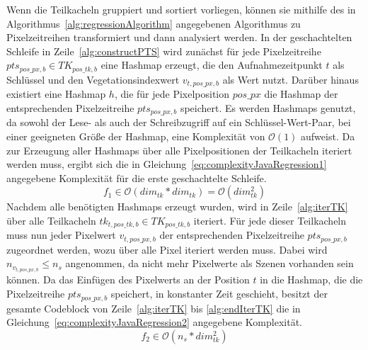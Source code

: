 Wenn die Teilkacheln gruppiert und sortiert vorliegen, können sie mithilfe des in Algorithmus~\ref{alg:regressionAlgorithm} angegebenen Algorithmus zu Pixelzeitreihen transformiert und dann analysiert werden. In der geschachtelten Schleife in Zeile~\ref{alg:constructPTS} wird zunächst für jede Pixelzeitreihe $pts_{pos\_px, b} \in TK_{pos\_tk, b}$ eine Hashmap erzeugt, die den Aufnahmezeitpunkt $t$ als Schlüssel und den Vegetationsindexwert $v_{t, pos\_px, b}$ als Wert nutzt. Darüber hinaus existiert eine Hashmap $h$, die für jede Pixelposition $pos\_px$ die Hashmap der entsprechenden Pixelzeitreihe $pts_{pos\_px, b}$ speichert. Es werden Hashmaps genutzt, da sowohl der Lese- als auch der Schreibzugriff auf ein Schlüssel-Wert-Paar, bei einer geeigneten Größe der Hashmap, eine Komplexität von $\mathcal{O}(1)$ aufweist. Da zur Erzeugung aller Hashmaps über alle Pixelpositionen der Teilkacheln iteriert werden muss, ergibt sich die in Gleichung~\ref{eq:complexityJavaRegression1} angegebene Komplexität für die erste geschachtelte Schleife. 
%
\begin{equation} \label{eq:complexityJavaRegression1}
f_1 \in \mathcal{O}(dim_{tk} * dim_{tk}) = \mathcal{O}(dim_{tk}^2)
\end{equation}
%
Nachdem alle benötigten Hashmaps erzeugt wurden, wird in Zeile~\ref{alg:iterTK} über alle Teilkacheln $tk_{t, pos\_{tk}, b} \in TK_{pos\_{tk}, b}$ iteriert. Für jede dieser Teilkacheln muss nun jeder Pixelwert $v_{t, pos\_px, b}$ der entsprechenden Pixelzeitreihe $pts_{pos\_px, b}$ zugeordnet werden, wozu über alle Pixel iteriert werden muss. Dabei wird $n_{v_{t, pos\_px, b}} \leq n_s$ angenommen, da nicht mehr Pixelwerte als Szenen vorhanden sein können. Da das Einfügen des Pixelwerts an der Position $t$ in die Hashmap, die die Pixelzeitreihe $pts_{pos\_px, b}$ speichert, in konstanter Zeit geschieht, besitzt der gesamte Codeblock von Zeile~\ref{alg:iterTK} bis \ref{alg:endIterTK} die in Gleichung~\ref{eq:complexityJavaRegression2} angegebene Komplexität.
%
\begin{equation} \label{eq:complexityJavaRegression2}
f_2 \in \mathcal{O}(n_{s} * dim_{tk}^2)
\end{equation}
%
